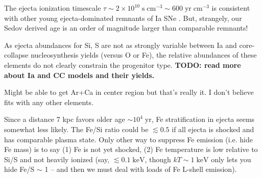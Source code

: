 \documentclass[twocolumn,tighten,trackchanges]{aastex61}
\newcommand*{\mt}{\mathrm}
\newcommand*{\unit}[1]{\;\mt{#1}}  %
\newcommand*{\abt}{\mathord{\sim}} %
\newcommand*{\TauUnits}{\unit{s\;cm^{-3}}}
\begin{document}

The ejecta ionization timescale
$\tau \sim 2 \times 10^{10} \TauUnits \sim 600 \unit{yr\;cm^{-3}}$
is consistent with other young ejecta-dominated remnants of Ia SNe
\citep[][Table 4]{badenes2007}.
But, strangely, our Sedov derived age is an order of magnitude larger than
comparable remnants!

As ejecta abundances for Si, S are not as strongly variable between Ia and
core-collapse nucleosynthesis yields (versus O or Fe), the relative abundances
of these elements do not clearly constrain the progenitor type.
\textbf{TODO: read more about Ia and CC models and their yields.}

Might be able to get Ar+Ca in center region but that's really it.
I don't believe fits with any other elements.

Since a distance 7 kpc favors older age $\abt 10^{4} \unit{yr}$, Fe
stratification in ejecta seems somewhat less likely.
The Fe/Si ratio could be $\lesssim 0.5$ if all ejecta is shocked and has
comparable plasma state.
Only other way to suppress Fe emission (i.e. hide Fe mass) is to say (1) Fe is
not yet shocked, (2) Fe temperature is low relative to Si/S and not heavily
ionized (say, $\lesssim 0.1 \unit{keV}$, though $kT \sim 1 \unit{keV}$ only
lets you hide Fe/S $\sim$ 1 -- and then we must deal with loads of Fe L-shell
emission).
\end{document}
